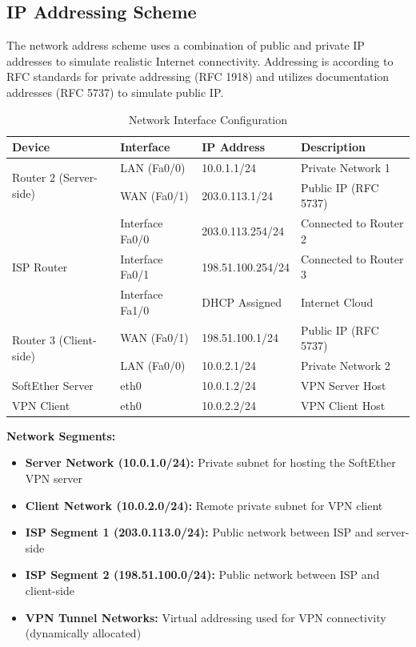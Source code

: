 \subsection{IP Addressing Scheme}

The network address scheme uses a combination of public and private IP addresses to simulate realistic Internet connectivity. Addressing is according to RFC standards for private addressing (RFC 1918) and utilizes documentation addresses (RFC 5737) to simulate public IP.

\begin{table}[H]
\centering
\caption{Network Interface Configuration}
\label{tab:ip_addressing}
\begin{tabular}{|l|l|l|l|}
\hline
\textbf{Device} & \textbf{Interface} & \textbf{IP Address} & \textbf{Description} \\
\hline
\multirow{2}{*}{Router 2 (Server-side)} & LAN (Fa0/0) & 10.0.1.1/24 & Private Network 1 \\
 & WAN (Fa0/1) & 203.0.113.1/24 & Public IP (RFC 5737) \\
\hline
\multirow{3}{*}{ISP Router} & Interface Fa0/0 & 203.0.113.254/24 & Connected to Router 2 \\
 & Interface Fa0/1 & 198.51.100.254/24 & Connected to Router 3 \\
 & Interface Fa1/0 & DHCP Assigned & Internet Cloud \\
\hline
\multirow{2}{*}{Router 3 (Client-side)} & WAN (Fa0/1) & 198.51.100.1/24 & Public IP (RFC 5737) \\
 & LAN (Fa0/0) & 10.0.2.1/24 & Private Network 2 \\
\hline
SoftEther Server & eth0 & 10.0.1.2/24 & VPN Server Host \\
\hline
VPN Client & eth0 & 10.0.2.2/24 & VPN Client Host \\
\hline
\end{tabular}
\end{table}

\textbf{Network Segments:}

\begin{itemize}
    \item \textbf{Server Network (10.0.1.0/24):} Private subnet for hosting the SoftEther VPN server
    \item \textbf{Client Network (10.0.2.0/24):} Remote private subnet for VPN client
    \item \textbf{ISP Segment 1 (203.0.113.0/24):} Public network between ISP and server-side 
    \item \textbf{ISP Segment 2 (198.51.100.0/24):} Public network between ISP and client-side 
    \item \textbf{VPN Tunnel Networks:} Virtual addressing used for VPN connectivity (dynamically allocated)
\end{itemize}

